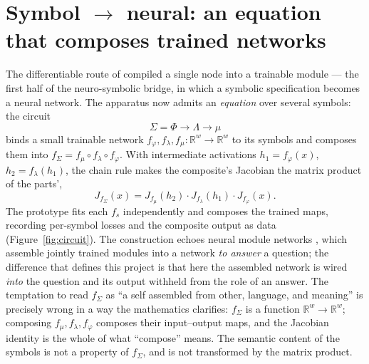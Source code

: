 \documentclass[11pt]{article}
\begin{document}
\section{Symbol \texorpdfstring{$\to$}{->} neural: an equation that composes trained networks}\label{sec:circ}
The differentiable route of \cite{paper2} compiled a single node into a trainable
module --- the first half of the neuro-symbolic bridge, in which a symbolic
specification becomes a neural network. The apparatus now admits an \emph{equation}
over several symbols: the circuit
\begin{equation}
\Sigma=\Phi\longrightarrow\Lambda\longrightarrow\mu
\end{equation}
binds a small trainable network $f_\varphi,f_\lambda,f_\mu:\mathbb{R}^w\to
\mathbb{R}^w$ to its symbols and composes them into $f_\Sigma=f_\mu\circ f_\lambda
\circ f_\varphi$. With intermediate activations $h_1=f_\varphi(x)$, $h_2=f_\lambda
(h_1)$, the chain rule makes the composite's Jacobian the matrix product of the
parts',
\begin{equation}
J_{f_\Sigma}(x)=J_{f_\mu}(h_2)\cdot J_{f_\lambda}(h_1)\cdot J_{f_\varphi}(x).
\end{equation}
The prototype fits each $f_s$ independently and composes the trained maps,
recording per-symbol losses and the composite output as data
(Figure~\ref{fig:circuit}). The construction echoes neural module networks
\cite{nmn}, which assemble jointly trained modules into a network \emph{to answer}
a question; the difference that defines this project is that here the assembled
network is wired \emph{into} the question and its output withheld from the role of
an answer. The temptation to read $f_\Sigma$ as ``a self assembled from other,
language, and meaning'' is precisely wrong in a way the mathematics clarifies:
$f_\Sigma$ is a function $\mathbb{R}^w\to\mathbb{R}^w$; composing $f_\mu,f_\lambda,
f_\varphi$ composes their input--output maps, and the Jacobian identity is the whole
of what ``compose'' means. The semantic content of the symbols is not a property
of $f_\Sigma$, and is not transformed by the matrix product.
\end{document}
